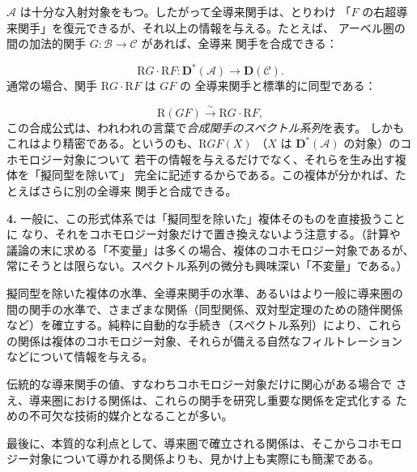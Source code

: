 \clearpage
{}
$\mathcal A$ は十分な入射対象をもつ。したがって全導来関手は、とりわけ
「$F$ の右超導来関手」を復元できるが、それ以上の情報を与える。たとえば、
アーベル圏の間の加法的関手 $G:\mathcal B\to\mathcal C$ があれば、全導来
関手を合成できる：

\[
\mathrm R G\mathbin{\cdot}\mathrm R F:
\mathbf D^*(\mathcal A)\longrightarrow\mathbf D(\mathcal C).
\]
通常の場合、関手 $\mathrm R G\mathbin{\cdot}\mathrm R F$ は $GF$ の
全導来関手と標準的に同型である：

\[
\mathrm R(GF)\xrightarrow{\sim}
\mathrm R G\mathbin{\cdot}\mathrm R F,
\]
この合成公式は、われわれの言葉で\emph{合成関手のスペクトル系列}を表す。
しかもこれはより精密である。というのも、$\mathrm R GF(X)$
（$X$ は $\mathbf D^*(\mathcal A)$ の対象）のコホモロジー対象について
若干の情報を与えるだけでなく、それらを生み出す複体を「擬同型を除いて」
完全に記述するからである。この複体が分かれば、たとえばさらに別の全導来
関手と合成できる。

\noindent\textbf{4.}\quad
一般に、この形式体系では「擬同型を除いた」複体そのものを直接扱うことに
なり、それをコホモロジー対象だけで置き換えないよう注意する。（計算や
議論の末に求める「不変量」は多くの場合、複体のコホモロジー対象であるが、
常にそうとは限らない。スペクトル系列の微分も興味深い「不変量」である。）

擬同型を除いた複体の水準、全導来関手の水準、あるいはより一般に導来圏の
間の関手の水準で、さまざまな関係（同型関係、双対型定理のための随伴関係
など）を確立する。純粋に自動的な手続き（スペクトル系列）により、これら
の関係は複体のコホモロジー対象、それらが備える自然なフィルトレーション
などについて情報を与える。

伝統的な導来関手の値、すなわちコホモロジー対象だけに関心がある場合で
さえ、導来圏における関係は、これらの関手を研究し重要な関係を定式化する
ための不可欠な技術的媒介となることが多い。

最後に、本質的な利点として、導来圏で確立される関係は、そこからコホモロ
ジー対象について導かれる関係よりも、見かけ上も実際にも簡潔である。
